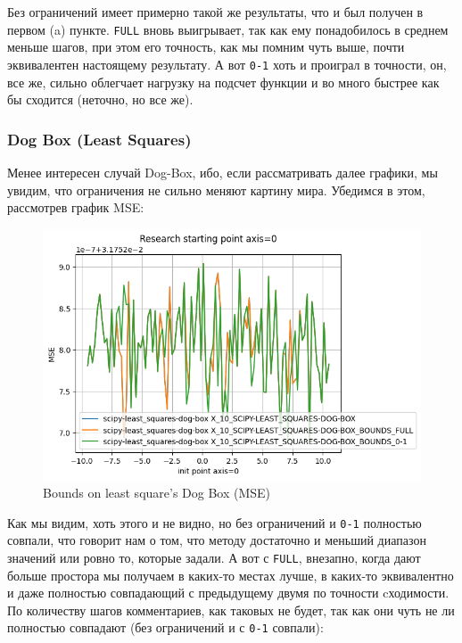 \documentclass[12pt, a4paper, oneside, final]{article}
\begin{document}
	Без ограничений имеет примерно такой же результаты, что и был получен в первом (a) пункте.
	\texttt{FULL} вновь выигрывает, так как ему понадобилось в среднем меньше шагов, при этом его точность, как мы помним чуть выше, почти эквивалентен настоящему результату.
	А вот \texttt{0-1} хоть и проиграл в точности, он, все же, сильно облегчает нагрузку на подсчет функции и во много быстрее как бы сходится (неточно, но все же).
	\subsubsection*{Dog Box (Least Squares)}
	Менее интересен случай Dog-Box, ибо, если рассматривать далее графики, мы увидим, что ограничения не сильно меняют картину мира.
	Убедимся в этом, рассмотрев график MSE:
	\begin{figure}[H]
		\centering
		\includegraphics[scale = 1]{Image/T2C_DOG-BOX_MSE.png}
		\caption*{Bounds on least square's Dog Box (MSE)}
	\end{figure}
	Как мы видим, хоть этого и не видно, но без ограничений и \texttt{0-1} полностью совпали, что говорит нам о том, что методу достаточно и меньший диапазон значений или ровно то, которые задали.
	А вот с \texttt{FULL}, внезапно, когда дают больше простора мы получаем в каких-то местах лучше, в каких-то эквивалентно и даже полностью совпадающий с предыдущему двумя по точности cходимости.
	По количеству шагов комментариев, как таковых не будет, так как они чуть не ли полностью совпадают (без ограничений и с \texttt{0-1} совпали):
\end{document}
